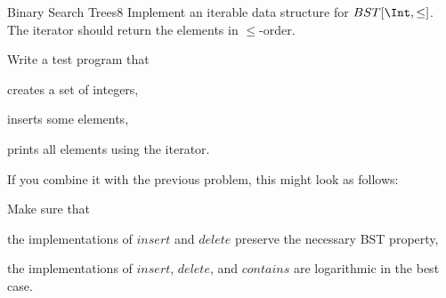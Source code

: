 \documentclass[a4paper]{article}
\begin{document}
\begin{problem}{Binary Search Trees}{8}
Implement an iterable data structure for $BST[\Int,\leq]$.
The iterator should return the elements in $\leq$-order.

Write a test program that
\begin{compactitem}
\item creates a set of integers,
\item inserts some elements,
\item prints all elements using the iterator.
\end{compactitem}

If you combine it with the previous problem, this might look as follows:
\begin{acode}
\end{acode}

Make sure that
\begin{compactitem}
 \item the implementations of $insert$ and $delete$ preserve the necessary BST property,
 \item the implementations of $insert$, $delete$, and $contains$ are logarithmic in the best case.
\end{compactitem}
\end{problem}
\end{document}
